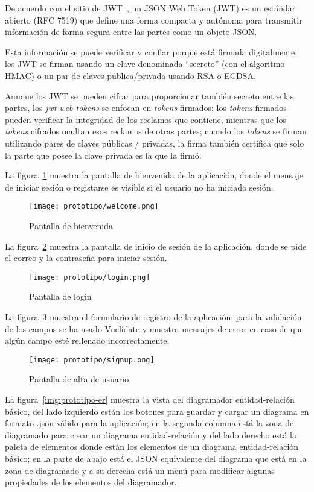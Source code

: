 De acuerdo con el sitio de JWT~\cite{jwt_web_2020}, un JSON Web Token (JWT) es un estándar abierto (RFC 7519) que define una forma compacta y autónoma para transmitir información de forma segura entre las partes como un objeto JSON.


Esta información se puede verificar y confiar porque está firmada digitalmente; los JWT se firman usando un clave denominada ``secreto'' (con el algoritmo HMAC) o un par de claves pública/privada usando RSA o ECDSA.

Aunque los JWT se pueden cifrar para proporcionar también secreto entre las partes, los \textit{jwt web tokens} se enfocan en \textit{tokens} firmados; los \textit{tokens} firmados pueden verificar la integridad de los reclamos que contiene, mientras que los \textit{tokens} cifrados ocultan esos reclamos de otras partes; cuando los \textit{tokens} se firman utilizando pares de claves públicas / privadas, la firma también certifica que solo la parte que posee la clave privada es la que la firmó.


La figura~\ref{img:prototipo-welcome} muestra la pantalla de bienvenida de la aplicación, donde el mensaje de iniciar sesión o registarse es visible si el usuario no ha iniciado sesión.

\begin{figure}[H]
    \centering
    \texttt{[image: prototipo/welcome.png]}
    \caption{Pantalla de bienvenida}
    \label{img:prototipo-welcome}
\end{figure}

La figura~\ref{img:prototipo-login} muestra la pantalla de inicio de sesión de la aplicación, donde se pide el correo y la contraseña para iniciar sesión.


\begin{figure}[H]
    \centering
    \texttt{[image: prototipo/login.png]}
    \caption{Pantalla de login}
    \label{img:prototipo-login}
\end{figure}
La figura~\ref{img:prototipo-signup} muestra el formulario de registro de la aplicación; para la validación de los campos se ha usado Vuelidate y muestra mensajes de error en caso de que algún campo esté rellenado incorrectamente.


\begin{figure}[H]
    \centering
    \texttt{[image: prototipo/signup.png]}
    \caption{Pantalla de alta de usuario}
    \label{img:prototipo-signup}
\end{figure}
La figura~\ref{img:prototipo-er} muestra la vista del diagramador entidad-relación básico, del lado izquierdo están los botones para guardar y cargar un diagrama en formato .json válido para la aplicación; en la segunda columna está la zona de diagramado para crear un diagrama entidad-relación y del lado derecho está la paleta de elementos donde están los elementos de un diagrama entidad-relación básico; en la parte de abajo está el JSON equivalente del diagrama que está en la zona de diagramado y a su derecha está un menú para modificar algunas propiedades de los elementos del diagramador.

